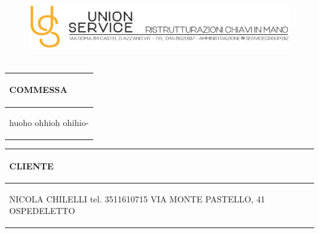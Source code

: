 \documentclass[a4paper]{article}
\begin{document}
                                \begin{figure}[!t]
                                \includegraphics[width=15.8cm, height=3cm]{intestazioneAlta2.jpg}
                                \end{figure}

                                \noindent\begin{tabular}{| L{72.2mm} |}
                                    \hline
                                    \vspace{2.5mm}
                                    \begin{spacing}{0}
                                    \textbf{COMMESSA}
                                    \end{spacing}\\
                                    \hline
                                    \vspace{4mm}
                                    \begin{spacing}{1.2}

                                huoho \newline ohhioh \newline ohihio\newline -
                                  \end{spacing}\\
                                    \hline
                                  \end{tabular}
                                  \quad
                                  \begin{tabular}{ | R{72.2mm} | }
                                    \hline
                                    \vspace{2.5mm}
                                    \begin{spacing}{0}
                                    \textbf{CLIENTE}
                                    \end{spacing}\\
                                    \hline
                                    \vspace{4mm}
                                    \begin{spacing}{1.2}

                               NICOLA CHILELLI \newline tel. 3511610715 \newline VIA MONTE PASTELLO, 41 OSPEDELETTO
                                  \end{spacing}\\
                                    \hline
                                  \end{tabular}
\end{document}
